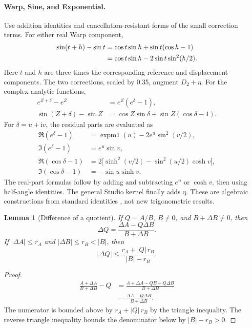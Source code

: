 \documentclass[11pt,a4paper]{article}
\numberwithin{equation}{section}
\newtheorem{lemma}{Lemma}[section]
\newcommand{\abs}[1]{\lvert#1\rvert}
\newcommand{\ii}{\mathrm{i}}
\DeclareMathOperator{\expmone}{expm1}
\begin{document}
\paragraph{Warp, Sine, and Exponential.}
Use addition identities and cancellation-resistant forms of the small
correction terms. For either real Warp component,
\begin{align}
  \sin(t+h)-\sin t
     &=\cos t\sin h+\sin t(\cos h-1)\notag\\
     &=\cos t\sin h-2\sin t\sin^2(h/2). \label{eq:warp-delta}
\end{align}
Here \(t\) and \(h\) are three times the corresponding reference and
displacement components. The two corrections, scaled by 0.35, augment
\(D_2+\eta\). For the complex analytic functions,
\begin{align}
  e^{Z+\delta}-e^Z&=e^Z(e^\delta-1),\\
  \sin(Z+\delta)-\sin Z
    &=\cos Z\sin\delta+\sin Z(\cos\delta-1).
\end{align}
For \(\delta=u+\ii v\), the residual parts are evaluated as
\begin{align}
  \Re(e^\delta-1)&=\expmone(u)-2e^u\sin^2(v/2),\\
  \Im(e^\delta-1)&=e^u\sin v,\\
  \Re(\cos\delta-1)&=
    2\big[\sinh^2(v/2)-\sin^2(u/2)\cosh v\big],\\
  \Im(\cos\delta-1)&=-\sin u\sinh v.
\end{align}
The real-part formulas follow by adding and subtracting \(e^u\) or
\(\cosh v\), then using half-angle identities. The general Studio
kernel finally adds \(\eta\). These are algebraic constructions from
standard identities \cite{dlmf}, not new trigonometric results.

\begin{lemma}[Difference of a quotient]\label{lem:quotient}
If \(Q=A/B\), \(B\ne0\), and \(B+\Delta B\ne0\), then
\begin{equation}
  \Delta Q=\frac{\Delta A-Q\Delta B}{B+\Delta B}.
  \label{eq:quotient}
\end{equation}
If \(\abs{\Delta A}\le r_A\) and \(\abs{\Delta B}\le r_B<\abs B\), then
\begin{equation}
  \abs{\Delta Q}\le
  \frac{r_A+\abs Q\,r_B}{\abs B-r_B}.
  \label{eq:quotient-bound}
\end{equation}
\end{lemma}
\begin{proof}
\begin{align*}
  \frac{A+\Delta A}{B+\Delta B}-Q
    &=\frac{A+\Delta A-QB-Q\Delta B}{B+\Delta B}\\
    &=\frac{\Delta A-Q\Delta B}{B+\Delta B}.
\end{align*}
The numerator is bounded above by \(r_A+\abs Q\,r_B\) by the triangle
inequality. The reverse triangle inequality bounds the denominator
below by \(\abs B-r_B>0\).
\end{proof}
\end{document}
